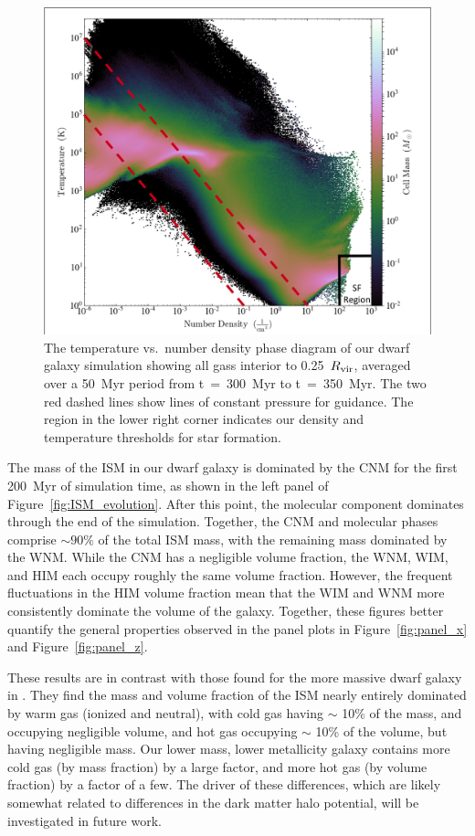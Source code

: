 \documentclass[twocolumn]{aastex61}
\begin{document}
\begin{figure}
\centering
\includegraphics[width=0.95\linewidth]{phase_diagram.png}
\caption{The temperature vs.\ number density phase diagram of our dwarf galaxy simulation showing all gass interior to 0.25~$R_{\rm vir}$, averaged over a 50~Myr period from t~=~300~Myr to t~=~350~Myr. The two red dashed lines show lines of constant pressure for guidance. The region in the lower right corner indicates our density and temperature thresholds for star formation.}
\label{fig:phase}
\end{figure} 

The mass of the ISM in our dwarf galaxy is dominated by the CNM for the first 200~Myr of simulation time, as shown in the left panel of Figure~\ref{fig:ISM_evolution}. After this point, the molecular component dominates through the end of the simulation.
Together, the CNM and molecular phases comprise $\sim 90\%$ of the total ISM mass, with the remaining mass dominated by the WNM. While the CNM has a negligible volume fraction, the WNM, WIM, and HIM each occupy roughly the same volume fraction. However, the frequent fluctuations in the HIM volume fraction mean that the WIM and WNM more consistently dominate the volume of the galaxy. Together, these figures better quantify the general properties observed in the panel plots in Figure~\ref{fig:panel_x} and Figure~\ref{fig:panel_z}. 

These results are in contrast with those found for the more massive dwarf galaxy in \citet{Hu2016,Hu2017}. They find the mass and volume fraction of the ISM nearly entirely dominated by warm gas (ionized and neutral), with cold gas having $\sim$ 10\% of the mass, and occupying negligible volume, and hot gas occupying $\sim$ 10\% of the volume, but having negligible mass. Our lower mass, lower metallicity galaxy contains more cold gas (by mass fraction) by a large factor, and more hot gas (by volume fraction) by a factor of a few. The driver of these differences, which are likely somewhat related to differences in the dark matter halo potential, will be investigated in future work.
\end{document}
